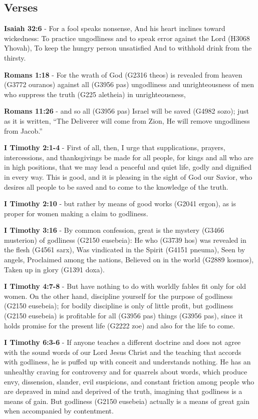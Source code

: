 \documentclass[11pt]{article}
\begin{document}
\subsection{Verses}
\label{sec:org991bec1}
\textbf{Isaiah 32:6} - For a fool speaks nonsense, And his heart inclines toward wickedness: To practice ungodliness and to speak error against the Lord (H3068 Yhovah), To keep the hungry person unsatisfied And to withhold drink from the thirsty.

\textbf{Romans 1:18} - For the wrath of God (G2316 theos) is revealed from heaven (G3772 ouranos) against all (G3956 pas) ungodliness and unrighteousness of men who suppress the truth (G225 aletheia) in unrighteousness,

\textbf{Romans 11:26} - and so all (G3956 pas) Israel will be saved (G4982 sozo); just as it is written, “The Deliverer will come from Zion, He will remove ungodliness from Jacob.”

\textbf{I Timothy 2:1-4} - First of all, then, I urge that supplications, prayers, intercessions, and thanksgivings be made for all people, for kings and all who are in high positions, that we may lead a peaceful and quiet life, godly and dignified in every way. This is good, and it is pleasing in the sight of God our Savior, who desires all people to be saved and to come to the knowledge of the truth.

\textbf{I Timothy 2:10} - but rather by means of good works (G2041 ergon), as is proper for women making a claim to godliness.

\textbf{I Timothy 3:16} - By common confession, great is the mystery (G3466 musterion) of godliness (G2150 eusebeia): He who (G3739 hos) was revealed in the flesh (G4561 sarx), Was vindicated in the Spirit (G4151 pneuma), Seen by angels, Proclaimed among the nations, Believed on in the world (G2889 kosmos), Taken up in glory (G1391 doxa).

\textbf{I Timothy 4:7-8} - But have nothing to do with worldly fables fit only for old women. On the other hand, discipline yourself for the purpose of godliness (G2150 eusebeia); for bodily discipline is only of little profit, but godliness (G2150 eusebeia) is profitable for all (G3956 pas) things (G3956 pas), since it holds promise for the present life (G2222 zoe) and also for the life to come.

\textbf{I Timothy 6:3-6} - If anyone teaches a different doctrine and does not agree with the sound words of our Lord Jesus Christ and the teaching that accords with godliness, he is puffed up with conceit and understands nothing. He has an unhealthy craving for controversy and for quarrels about words, which produce envy, dissension, slander, evil suspicions, and constant friction among people who are depraved in mind and deprived of the truth, imagining that godliness is a means of gain. But godliness (G2150 eusebeia) actually is a means of great gain when accompanied by contentment.
\end{document}
